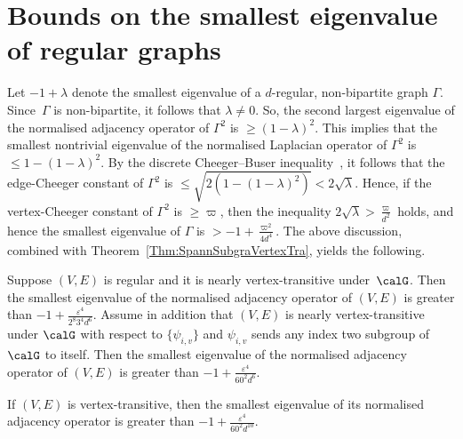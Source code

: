 \section{Bounds on the smallest eigenvalue of regular graphs} 

Let $-1+\lambda$ denote the smallest eigenvalue of a $d$-regular, non-bipartite graph $\Gamma$. Since~$\Gamma$ is non-bipartite, it follows that $\lambda \neq 0$. So, the second largest eigenvalue of the normalised adjacency operator of $\Gamma^2$ is $\geq (1- \lambda)^2$. This implies that the smallest nontrivial eigenvalue of the normalised Laplacian operator of $\Gamma^2$ is $\leq 1 - (1-\lambda)^2$. By the discrete Cheeger--Buser inequality~\cite[Theorem 2.2]{ChungSpectralGraphTheory}, it follows that the edge-Cheeger constant of $\Gamma^2$ is $\leq \sqrt {2 (1 - (1-\lambda)^2)} < 2\sqrt \lambda$. Hence, if the vertex-Cheeger constant of $\Gamma^2$ is $\geq \varpi$, then the inequality $2 \sqrt \lambda > \frac{\varpi}{d^2}$ holds, and hence the smallest eigenvalue of $\Gamma$ is $> -1 + \frac {\varpi^2}{4d^4}$. 
The above discussion, combined with Theorem~\ref{Thm:SpannSubgraVertexTra}, yields the following. 

\begin{proposition}
\label{Cor:AlmostGraphAut}
Suppose $(V, E)$ is regular and it is nearly vertex-transitive under~$\calG$. Then the smallest eigenvalue of the normalised adjacency operator of $(V, E)$ is greater than $-1+ \frac {\varepsilon^4}{2^{8}3^{4}d^6}$. 
Assume in addition that $(V, E)$ is nearly vertex-transitive under $\calG$ with respect to $\{\psi_{i,v}\}$ and $\psi_{i, v}$ sends any index two subgroup of $\calG$ to itself. Then the smallest eigenvalue of the normalised adjacency operator of $(V, E)$ is greater than $ -1+\frac {\varepsilon^4}{60^2 d^6}$. 
\end{proposition}

\begin{proposition}
\label{Cor:SpannSubgraVertexTra}
If $(V, E)$ is vertex-transitive, then the smallest eigenvalue of its normalised adjacency operator is greater than $ -1+\frac {\varepsilon^4}{60^2 d^{10}}$. 
\end{proposition}
